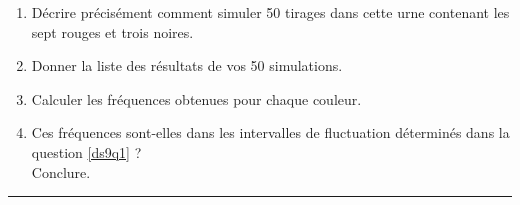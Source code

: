 \begin{exo}[8 points]
\begin{enumerate}
\begin{center}
\rand{} \quad \rand{} \quad \rand{} \quad \rand{} \quad \rand{} \quad \rand{} \quad \rand{} \quad \rand{} \quad \rand{} \quad \rand{} \quad \rand{} \quad \rand{} \quad \rand{} \quad \rand{} \quad \rand{} \quad \rand{} \quad \rand{} \quad \rand{} \quad \rand{} \quad \rand{}

\rand{} \quad \rand{} \quad \rand{} \quad \rand{} \quad \rand{} \quad \rand{} \quad \rand{} \quad \rand{} \quad \rand{} \quad \rand{} \quad \rand{} \quad \rand{} \quad \rand{} \quad \rand{} \quad \rand{} \quad \rand{} \quad \rand{} \quad \rand{} \quad \rand{} \quad \rand{}

\rand{} \quad \rand{} \quad \rand{} \quad \rand{} \quad \rand{} \quad \rand{} \quad \rand{} \quad \rand{} \quad \rand{} \quad \rand{} \quad \rand{} \quad \rand{} \quad \rand{} \quad \rand{} \quad \rand{} \quad \rand{} \quad \rand{} \quad \rand{} \quad \rand{} \quad \rand{}
\end{center}
\begin{enumerate}
 \item D\'ecrire pr\'ecis\'ement comment simuler 50 tirages dans cette urne contenant les sept rouges et trois noires.
 \item Donner la liste des r\'esultats de vos 50 simulations.
 \item Calculer les fréquences obtenues pour chaque couleur.
 \item Ces fr\'equences sont-elles dans les intervalles de fluctuation d\'etermin\'es dans la question \ref{ds9q1} ?\\
	Conclure.
\end{enumerate}

\end{enumerate}
\end{exo}

\medskip

\hrule

\sautpage

